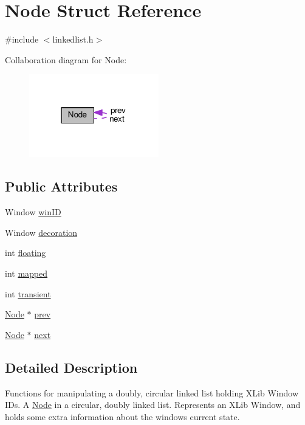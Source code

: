 \hypertarget{structNode}{}\section{Node Struct Reference}
\label{structNode}


{\ttfamily \#include $<$linkedlist.\+h$>$}



Collaboration diagram for Node\+:\nopagebreak
\begin{figure}[H]
\begin{center}
\leavevmode
\includegraphics[width=160pt]{structNode__coll__graph}
\end{center}
\end{figure}
\subsection*{Public Attributes}
\begin{DoxyCompactItemize}
\item 
Window \hyperlink{structNode_a9b48ab73d4bb7a253057af4aaa165a1d}{win\+I\+D}
\item 
Window \hyperlink{structNode_a58ff43cedbc9c788aa1298715042768d}{decoration}
\item 
int \hyperlink{structNode_ac759c6f57f027e265a5e369a69114479}{floating}
\item 
int \hyperlink{structNode_a9f51700be8fa8a1e0c032f0f18f9f744}{mapped}
\item 
int \hyperlink{structNode_ab914f0acd82df7f22818d31337442792}{transient}
\item 
\hyperlink{structNode}{Node} $\ast$ \hyperlink{structNode_a632ea91c6a13082308f7692649a68880}{prev}
\item 
\hyperlink{structNode}{Node} $\ast$ \hyperlink{structNode_a2559a716f69ccaa76d648d9f1b83065e}{next}
\end{DoxyCompactItemize}


\subsection{Detailed Description}
Functions for manipulating a doubly, circular linked list holding X\+Lib Window I\+Ds. A \hyperlink{structNode}{Node} in a circular, doubly linked list. Represents an X\+Lib Window, and holds some extra information about the window\textquotesingle{}s current state. 

